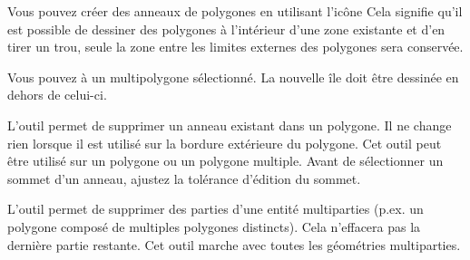 

Vous pouvez créer des anneaux de polygones en utilisant l'icône  Cela signifie qu'il est possible de dessiner des polygones à l'intérieur d'une zone existante et d'en tirer un trou,  seule la zone entre les limites externes des polygones sera conservée.


Vous pouvez  à un multipolygone sélectionné. La nouvelle île doit être dessinée en dehors de celui-ci.


L'outil  permet de supprimer un anneau existant dans un polygone. Il ne change rien lorsque il est utilisé sur la bordure extérieure du polygone. Cet outil peut être utilisé sur un polygone ou un polygone multiple. Avant de sélectionner un sommet d'un anneau, ajustez la tolérance d'édition du sommet.


L'outil  permet de supprimer des parties d'une entité multiparties (p.ex. un polygone composé de multiples polygones distincts). Cela n'effacera pas la dernière partie restante. Cet outil marche avec toutes les géométries multiparties.

